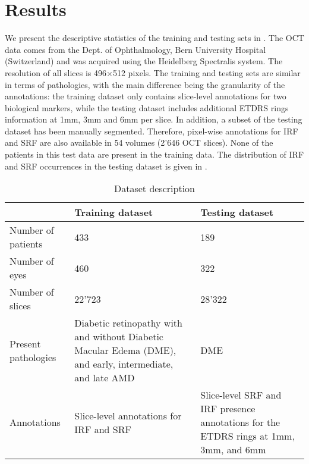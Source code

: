 \section{Results}
\label{sec:oct_results}
We present the descriptive statistics of the training and testing sets in . The OCT data comes from the Dept. of Ophthalmology, Bern University Hospital (Switzerland) and was acquired using the Heidelberg Spectralis system. The resolution of all slices is 496×512 pixels. The training and testing sets are similar in terms of pathologies, with the main difference being  the granularity of the annotations: the training dataset only contains slice-level annotations for two biological markers, while the testing dataset includes additional ETDRS rings information at 1mm, 3mm and 6mm per slice. In addition, a subset of the testing dataset has been manually segmented. Therefore, pixel-wise annotations for IRF and SRF are also available in 54 volumes (2’646 OCT slices). None of the patients in this test data are present in the training data. The distribution of IRF and SRF occurrences in the testing dataset is given in .

\noindent
\begin{table*}[t]
\centering
\caption{Dataset description}
\label{tab:dataset}
\begin{tabular}{p{4cm}p{5.5cm}p{5.5cm}}
\toprule
 & Training dataset & Testing dataset \\ \midrule
Number of patients & 433 & 189 \\
Number of eyes & 460 & 322 \\
Number of slices & 22’723 & 28'322 \\
Present pathologies & Diabetic retinopathy with and without Diabetic Macular Edema (DME), and early, intermediate, and late AMD & DME \\
Annotations & Slice-level annotations for IRF and SRF & Slice-level SRF and IRF presence   annotations for the ETDRS rings at 1mm, 3mm, and 6mm \\ \bottomrule
\end{tabular}

\end{table*}

